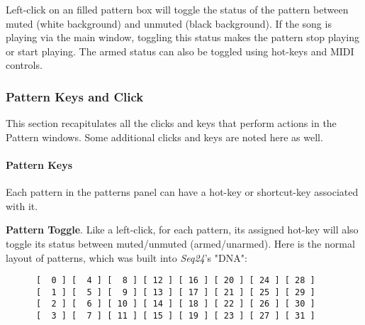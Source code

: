    Left-click on an filled pattern box will toggle the status of the
   pattern between muted (white background) and unmuted (black background).
   If the song is playing via the main window, toggling this status makes
   the pattern stop playing or start playing.  The armed status
   can also be toggled using hot-keys and MIDI controls.




\subsubsection{Pattern Keys and Click}
\label{subsubsec:patterns_pattern_keys_and_clicks}

   This section recapitulates all the clicks and keys that perform actions
   in the Pattern windows.  Some additional clicks and keys are noted here
   as well.

\paragraph{Pattern Keys}
\label{paragraph:patterns_pattern_keys}

   Each pattern in the patterns panel can have a hot-key or shortcut-key
   associated with it.

   \textbf{Pattern Toggle}.
   Like a left-click, for each pattern, its assigned hot-key will
   also toggle its status between muted/unmuted (armed/unarmed).
   Here is the normal layout of patterns, which was built into
   \textsl{Seq24}'s "DNA":

   \begin{verbatim}
      [  0 ] [  4 ] [  8 ] [ 12 ] [ 16 ] [ 20 ] [ 24 ] [ 28 ]
      [  1 ] [  5 ] [  9 ] [ 13 ] [ 17 ] [ 21 ] [ 25 ] [ 29 ]
      [  2 ] [  6 ] [ 10 ] [ 14 ] [ 18 ] [ 22 ] [ 26 ] [ 30 ]
      [  3 ] [  7 ] [ 11 ] [ 15 ] [ 19 ] [ 23 ] [ 27 ] [ 31 ]
   \end{verbatim}

